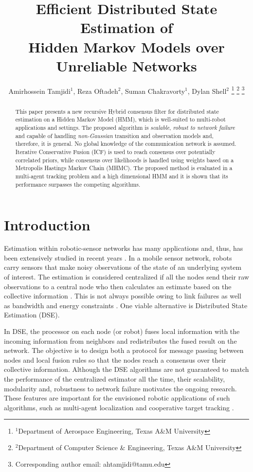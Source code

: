 \documentclass[conference]{IEEEtran}
\title{\LARGE \bf Efficient Distributed State Estimation of\\ Hidden Markov Models over Unreliable
	Networks}
\author {Amirhossein Tamjidi$^{1}$, Reza Oftadeh$^{2}$, Suman Chakravorty$^{1}$, Dylan Shell$^{2}$
\thanks{$^{1}$Department of Aerospace Engineering, Texas A\&M University}
\thanks{$^{2}$Department of Computer Science \& Engineering, Texas A\&M University}
\thanks{Corresponding author email: ahtamjidi@tamu.edu}}
\theoremstyle{remark}
\begin{document}
	
	\maketitle
\begin{abstract}
This paper presents a new recursive Hybrid consensus filter for 
distributed state estimation on a Hidden Markov Model (HMM), which is 
well-suited to multi-robot applications and settings. The proposed algorithm is 
\textit{scalable}, \textit{robust to network failure} and capable of handling 
\textit{non-Gaussian} transition and observation models and, therefore, it is 
general. No global knowledge of the communication network is assumed. Iterative 
Conservative Fusion (ICF) is used to reach consensus over potentially 
correlated priors, while consensus over likelihoods is handled using weights 
based on a Metropolis Hastings Markov Chain (MHMC). The proposed method is 
evaluated in a multi-agent tracking problem and a high dimensional HMM and it 
is shown that  its performance surpasses the competing algorithms. 
\end{abstract}

\section{Introduction}
Estimation within robotic-sensor networks has many applications and, thus, has been 
extensively studied in recent years 
\cite{durrant2001data,campbell2016distributed,boem2015decentralized}. In a 
 mobile sensor network, robots carry sensors that make noisy observations of the 
state of an underlying system of interest. The estimation is considered 
centralized if all the nodes send their raw observations to a central node who 
then calculates an estimate based on the collective information 
\cite{ahmed201522}. This is not always possible owing to link failures as well as 
bandwidth and energy constraints \cite{Zhang_ttradeof1}. One viable alternative 
is Distributed State Estimation (DSE).

In DSE, the processor on each node (or robot) fuses local information with the incoming information from neighbors and redistributes the fused result on the network. The objective is to design both a protocol for message passing between nodes and local fusion rules so that the nodes reach a consensus over their collective information. Although the DSE algorithms are not guaranteed to match the performance of the centralized estimator all the time, their scalability, modularity and, robustness to network failure motivates the ongoing research. These features are important for the envisioned robotic applications of such algorithms, such as multi-agent localization \cite{5509143} and cooperative target tracking \cite{whitacre2013cooperative}. 
\end{document}
